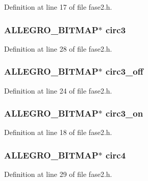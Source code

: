 Definition at line 17 of file fase2.\-h.

\hypertarget{struct_level_dois_aaa21201ceebf455212233414bd6eedbc}{
\subsubsection[{circ3}]{\setlength{\rightskip}{0pt plus 5cm}A\-L\-L\-E\-G\-R\-O\-\_\-\-B\-I\-T\-M\-A\-P$\ast$ circ3}}\label{struct_level_dois_aaa21201ceebf455212233414bd6eedbc}


Definition at line 28 of file fase2.\-h.

\hypertarget{struct_level_dois_a91273d7098df87dd93c9f9a10b62ed08}{
\subsubsection[{circ3\-\_\-off}]{\setlength{\rightskip}{0pt plus 5cm}A\-L\-L\-E\-G\-R\-O\-\_\-\-B\-I\-T\-M\-A\-P$\ast$ circ3\-\_\-off}}\label{struct_level_dois_a91273d7098df87dd93c9f9a10b62ed08}


Definition at line 24 of file fase2.\-h.

\hypertarget{struct_level_dois_ad58139cfabe6836662aec8a3293c9208}{
\subsubsection[{circ3\-\_\-on}]{\setlength{\rightskip}{0pt plus 5cm}A\-L\-L\-E\-G\-R\-O\-\_\-\-B\-I\-T\-M\-A\-P$\ast$ circ3\-\_\-on}}\label{struct_level_dois_ad58139cfabe6836662aec8a3293c9208}


Definition at line 18 of file fase2.\-h.

\hypertarget{struct_level_dois_a1adf43c25b4c9b87aeb45c1e4bd24d4f}{
\subsubsection[{circ4}]{\setlength{\rightskip}{0pt plus 5cm}A\-L\-L\-E\-G\-R\-O\-\_\-\-B\-I\-T\-M\-A\-P$\ast$ circ4}}\label{struct_level_dois_a1adf43c25b4c9b87aeb45c1e4bd24d4f}


Definition at line 29 of file fase2.\-h.


